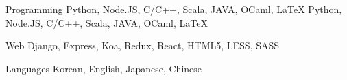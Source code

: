 

\begin{cvskills}

  \cvskill
    {Programming} %
    {Python, Node.JS, C/C++, Scala, JAVA, OCaml, LaTeX} %
	{Python, Node.JS, C/C++, Scala, JAVA, OCaml, LaTeX} %

  \cvskill
    {Web} %
    {Django, Express, Koa, Redux, React, HTML5, LESS, SASS} %

  \cvskill
    {Languages} %
    {Korean, English, Japanese, Chinese} %

\end{cvskills}
